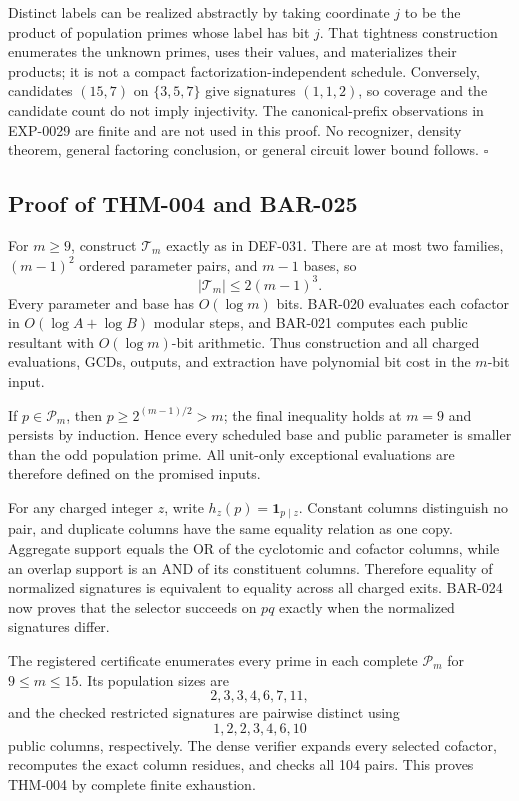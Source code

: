 \documentclass[11pt]{article}
\begin{document}
Distinct labels can be realized abstractly by taking coordinate \(j\) to be
the product of population primes whose label has bit \(j\). That tightness
construction enumerates the unknown primes, uses their values, and
materializes their products; it is not a compact factorization-independent
schedule. Conversely, candidates \((15,7)\) on \(\{3,5,7\}\) give signatures
\((1,1,2)\), so coverage and the candidate count do not imply injectivity.
The canonical-prefix observations in EXP-0029 are finite and are not used in
this proof. No recognizer, density theorem, general factoring conclusion, or
general circuit lower bound follows. \(\square\)

\subsection{Proof of THM-004 and BAR-025}
\label{proof:THM-004-BAR-025}

For \(m\ge9\), construct \(\mathcal T_m\) exactly as in DEF-031. There are at
most two families, \((m-1)^2\) ordered parameter pairs, and \(m-1\) bases, so
\[
|\mathcal T_m|\le2(m-1)^3.
\]
Every parameter and base has \(O(\log m)\) bits. BAR-020 evaluates each
cofactor in \(O(\log A+\log B)\) modular steps, and BAR-021 computes each
public resultant with \(O(\log m)\)-bit arithmetic. Thus construction and
all charged evaluations, GCDs, outputs, and extraction have polynomial bit
cost in the \(m\)-bit input.

If \(p\in\mathcal P_m\), then \(p\ge2^{(m-1)/2}>m\); the final inequality
holds at \(m=9\) and persists by induction. Hence every scheduled base and
public parameter is smaller than the odd population prime. All unit-only
exceptional evaluations are therefore defined on the promised inputs.

For any charged integer \(z\), write \(h_z(p)=\mathbf1_{p\mid z}\).
Constant columns distinguish no pair, and duplicate columns have the same
equality relation as one copy. Aggregate support equals the OR of the
cyclotomic and cofactor columns, while an overlap support is an AND of its
constituent columns. Therefore equality of normalized signatures is
equivalent to equality across all charged exits. BAR-024 now proves that the
selector succeeds on \(pq\) exactly when the normalized signatures differ.

The registered certificate enumerates every prime in each complete
\(\mathcal P_m\) for \(9\le m\le15\). Its population sizes are
\[
2,3,3,4,6,7,11,
\]
and the checked restricted signatures are pairwise distinct using
\[
1,2,2,3,4,6,10
\]
public columns, respectively. The dense verifier expands every selected
cofactor, recomputes the exact column residues, and checks all 104 pairs.
This proves THM-004 by complete finite exhaustion.
\end{document}
